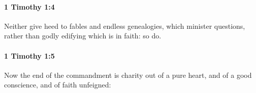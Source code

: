 		\paragraph{1 Timothy 1:4} %
			\label{1TIMOTHY-1-4}

			Neither give heed to fables and endless genealogies, which minister questions, rather than godly edifying which is in faith: so do.

			\begin{framed}
			\scriptsize
				\begin{compactdesc}
					\item[SBLG] 
				\end{compactdesc}
			\end{framed}

		\paragraph{1 Timothy 1:5} %
			\label{1TIMOTHY-1-5}

			Now the end of the commandment is charity out of a pure heart, and of a good conscience, and of faith unfeigned:

